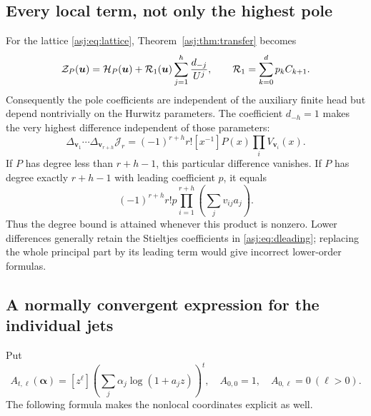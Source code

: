 \documentclass[11pt]{article}
\numberwithin{equation}{section}
\theoremstyle{definition}\newtheorem{definition}[theorem]{Definition}
\theoremstyle{remark}\newtheorem{remark}[theorem]{Remark}\newtheorem{example}[theorem]{Example}
\newcommand{\calJ}{\mathcal J}\newcommand{\calZ}{\mathcal Z}
\begin{document}
\subsection{Every local term, not only the highest pole}
For the lattice \eqref{asj:eq:lattice}, Theorem~\ref{asj:thm:transfer} becomes
\begin{equation}\label{asj:eq:Hurwitzgerm}
 \calZ_P(\boldsymbol u)
  =\calH_P(\boldsymbol u)
     +\calR_1(\boldsymbol u)\sum_{j=1}^h\frac{d_{-j}}{U^j},
 \qquad \calR_1=\sum_{k=0}^d p_k C_{k+1}.
\end{equation}
Consequently the pole coefficients are independent of the auxiliary
finite head but depend nontrivially on the Hurwitz parameters. The
coefficient $d_{-h}=1$ makes the very highest difference independent of
those parameters:
\begin{equation}\label{asj:eq:Hurwitztop}
 \Delta_{\boldsymbol v_1}\cdots\Delta_{\boldsymbol v_{r+h}}
 \calJ_r
 =(-1)^{r+h}r![x^{-1}]P(x)\prod_iV_{\boldsymbol v_i}(x).
\end{equation}
If $P$ has degree less than $r+h-1$, this particular difference vanishes.
If $P$ has degree exactly $r+h-1$ with leading coefficient $p$, it equals
\begin{equation}\label{asj:eq:Hurwitzsharp}
 (-1)^{r+h}r!p\prod_{i=1}^{r+h}\left(\sum_jv_{ij}a_j\right).
\end{equation}
Thus the degree bound is attained whenever this product is nonzero.
Lower differences generally retain the Stieltjes coefficients in
\eqref{asj:eq:dleading}; replacing the whole principal part by its leading
term would give incorrect lower-order formulas.

\subsection{A normally convergent expression for the individual jets}
Put
\[
 A_{t,\ell}(\boldsymbol\alpha)
   =[z^\ell]\left(\sum_j\alpha_j\log(1+a_jz)\right)^t,
 \quad A_{0,0}=1,\quad A_{0,\ell}=0\ (\ell>0).
\]
The following formula makes the nonlocal coordinates explicit as well.
\end{document}
